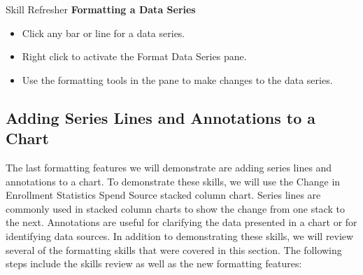 \begin{center}
	\begin{sklbox}{Skill Refresher}
		\textbf{Formatting a Data Series}
		\\
		\begin{itemize}
			\setlength{\itemsep}{0pt}
			\setlength{\parskip}{0pt}
			\setlength{\parsep}{0pt}
			
			\item Click any bar or line for a data series.
			\item Right click to activate the Format Data Series pane.
			\item Use the formatting tools in the pane to make changes to the data series.
			
		\end{itemize}
	\end{sklbox}
\end{center}

\subsection{Adding Series Lines and Annotations to a Chart}

The last formatting features we will demonstrate are adding series lines and annotations to a chart.
To demonstrate these skills, we will use the Change in Enrollment Statistics Spend Source stacked
column chart. Series lines are commonly used in stacked column charts to show the change from one
stack to the next. Annotations are useful for clarifying the data presented in a chart or for identifying
data sources. In addition to demonstrating these skills, we will review several of the formatting skills
that were covered in this section. The following steps include the skills review as well as the new
formatting features:

